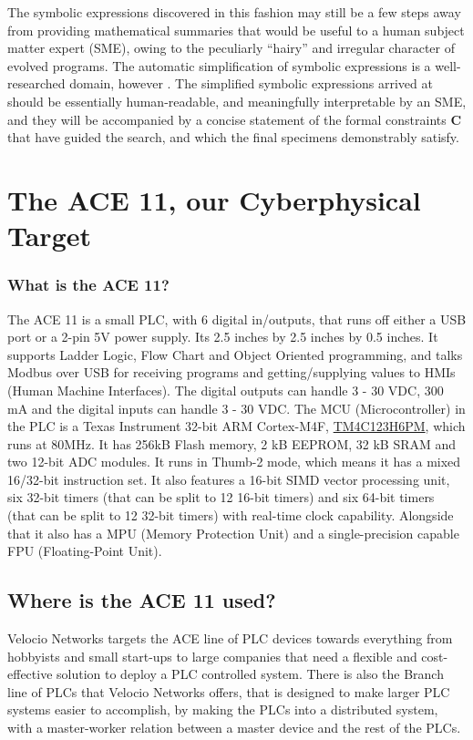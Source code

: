 \documentclass[11pt]{article}
\begin{document}
The symbolic expressions discovered in this fashion may still be a few steps away from providing mathematical summaries that would be useful to a human subject matter expert (SME), owing to the peculiarly ``hairy'' and irregular character of evolved programs. The automatic simplification of symbolic expressions is a well-researched domain, however \cite{bailey2014simp}. The simplified symbolic expressions arrived at should be essentially human-readable, and meaningfully interpretable by an SME, and they will be accompanied by a concise statement of the formal constraints \textbf{C} that have guided the search, and which the final specimens demonstrably satisfy.


\section{The ACE 11, our Cyberphysical Target}
\label{sec:orga8f1d4c}
\subsubsection{What is the ACE 11?}
\label{sec:orgd5be3cb}
The ACE 11 is a small PLC, with 6 digital in/outputs, that runs off either a USB port or a 2-pin 5V power supply. Its 2.5 inches by 2.5 inches by 0.5 inches. It supports Ladder Logic, Flow Chart and Object Oriented programming, and talks Modbus over USB for receiving programs and getting/supplying values to HMIs (Human Machine Interfaces). The digital outputs can handle 3 - 30 VDC, 300 mA and the digital inputs can handle 3 - 30 VDC. The MCU (Microcontroller) in the PLC is a Texas Instrument 32-bit ARM Cortex-M4F, \href{https://www.ti.com/product/TM4C1232H6PM}{TM4C123H6PM}, which runs at 80MHz. It has 256kB Flash memory, 2 kB EEPROM, 32 kB SRAM and two 12-bit ADC modules. It runs in Thumb-2 mode, which means it has a mixed 16/32-bit instruction set. It also features a 16-bit SIMD vector processing unit, six 32-bit timers (that can be split to 12 16-bit timers) and six 64-bit timers (that can be split to 12 32-bit timers) with real-time clock capability. Alongside that it also has a MPU (Memory Protection Unit) and a single-precision capable FPU (Floating-Point Unit).

\subsection{Where is the ACE 11 used?}
\label{sec:org0f8b5e1}
Velocio Networks targets the ACE line of PLC devices towards everything from hobbyists and small start-ups to large companies that need a flexible and cost-effective solution to deploy a PLC controlled system. There is also the Branch line of PLCs that Velocio Networks offers, that is designed to make larger PLC systems easier to accomplish, by making the PLCs into a distributed system, with a master-worker relation between a master device and the rest of the PLCs.
\end{document}
